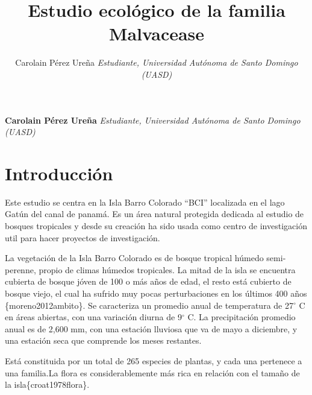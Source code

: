 \documentclass[11pt,]{article}
\title{Estudio ecológico de la familia Malvacease  }
\author{\Large Carolain Pérez Ureña\vspace{0.05in} \newline\normalsize\emph{Estudiante, Universidad Autónoma de Santo Domingo (UASD)}  }
\date{}
\newcommand*{\authorfont}{\fontfamily{phv}\selectfont}
\begin{document}
	
%

{%
\setlength{\parindent}{0pt}
\thispagestyle{plain}
{\fontsize{18}{20}\selectfont\raggedright 
\maketitle  %

}

{
   \vskip 13.5pt\relax \normalsize\fontsize{11}{12} 
\textbf{\authorfont Carolain Pérez Ureña} \hskip 15pt \emph{\small Estudiante, Universidad Autónoma de Santo Domingo (UASD)}   

}

}






\vskip 6.5pt


\noindent  \section{Introducción}\label{introducciuxf3n}

Este estudio se centra en la Isla Barro Colorado ``BCI'' localizada en
el lago Gatún del canal de panamá. Es un área natural protegida dedicada
al estudio de bosques tropicales y desde su creación ha sido usada como
centro de investigación util para hacer proyectos de investigación.

La vegetación de la Isla Barro Colorado es de bosque tropical húmedo
semi-perenne, propio de climas húmedos tropicales. La mitad de la isla
se encuentra cubierta de bosque jóven de 100 o más años de edad, el
resto está cubierto de bosque viejo, el cual ha sufrido muy pocas
perturbaciones en los últimos 400 años \{moreno2012ambito\}. Se
caracteriza un promedio anual de temperatura de 27\(^{\circ}\) C en
áreas abiertas, con una variación diurna de 9\(^{\circ}\) C. La
precipitación promedio anual es de 2,600 mm, con una estación lluviosa
que va de mayo a diciembre, y una estación seca que comprende los meses
restantes.

Está constituida por un total de 265 especies de plantas, y cada una
pertenece a una familia.La flora es considerablemente más rica en
relación con el tamaño de la isla\{croat1978flora\}.
\end{document}

